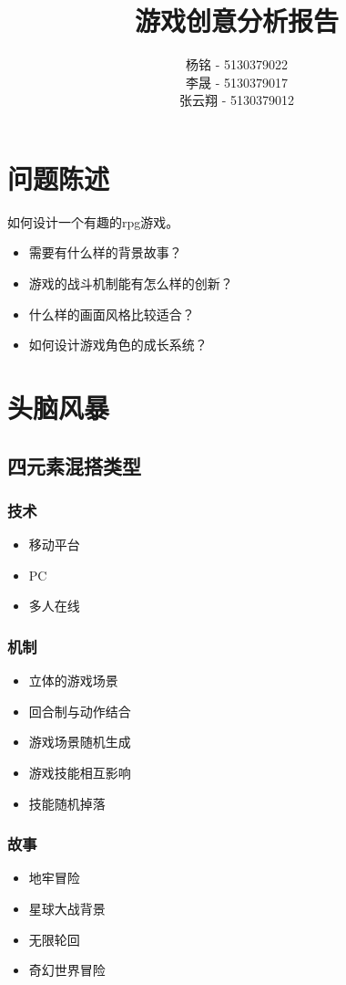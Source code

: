 \documentclass{article}
\author{杨铭 - 5130379022\\
	李晟 - 5130379017\\
	张云翔 - 5130379012}
\title{游戏创意分析报告}
\begin{document}
\maketitle
\section{问题陈述}
如何设计一个有趣的rpg游戏。
\begin{itemize}
	\item 需要有什么样的背景故事？
	\item 游戏的战斗机制能有怎么样的创新？
	\item 什么样的画面风格比较适合？
	\item 如何设计游戏角色的成长系统？
\end{itemize}
\section{头脑风暴}
\subsection{四元素混搭类型}
\subsubsection{技术}
\begin{itemize}
	\item 移动平台
	\item PC
	\item 多人在线
\end{itemize}
\subsubsection{机制}
\begin{itemize}
	\item 立体的游戏场景
	\item 回合制与动作结合
	\item 游戏场景随机生成
	\item 游戏技能相互影响
	\item 技能随机掉落
\end{itemize}
\subsubsection{故事}
\begin{itemize}
	\item 地牢冒险
	\item 星球大战背景
	\item 无限轮回
	\item 奇幻世界冒险
\end{itemize}
\end{document}
